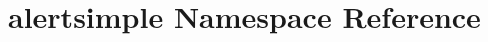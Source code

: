\hypertarget{namespacealertsimple}{\section{alertsimple Namespace Reference}
\label{namespacealertsimple}
}
